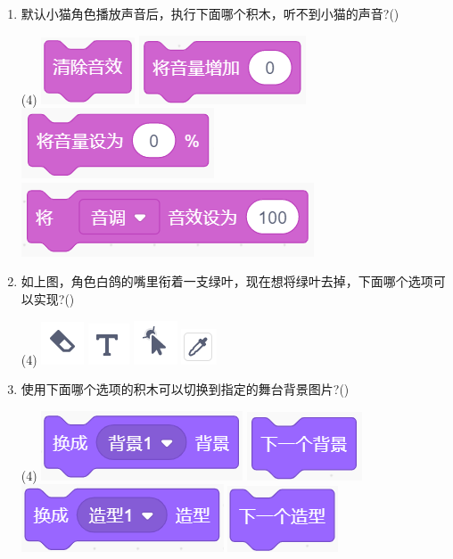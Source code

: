 \documentclass[10pt, a4paper]{article}
\begin{document}
\begin{enumerate}
        \item  默认小猫角色播放声音后，执行下面哪个积木，听不到小猫的声音?(\qquad)
        \begin{tasks}(4)
            \task \includegraphics[width=.06\textwidth]{15a.png}
            \task \includegraphics[width=.11\textwidth]{15b.png}
            \task \includegraphics[width=.11\textwidth]{15c.png}
            \task \includegraphics[width=.18\textwidth]{15d.png}
        \end{tasks}
        
        \item 如上图，角色白鸽的嘴里衔着一支绿叶，现在想将绿叶去掉，下面哪个选项可以实现?(\qquad)
        \begin{tasks}(4)
            \task \includegraphics[width=.05\textwidth]{16a.png}
            \task \includegraphics[width=.05\textwidth]{16b.png}
            \task \includegraphics[width=.05\textwidth]{16c.png}
            \task \includegraphics[width=.05\textwidth]{16d.png}
        \end{tasks}

        \newpage
        \item 使用下面哪个选项的积木可以切换到指定的舞台背景图片?(\qquad)
        \begin{tasks}(4)
            \task \includegraphics[width=.15\textwidth]{17a.png}
            \task \includegraphics[width=.1\textwidth]{17b.png}
            \task \includegraphics[width=.15\textwidth]{17c.png}
            \task \includegraphics[width=.1\textwidth]{17d.png}
        \end{tasks}


\end{enumerate}
\end{document}
